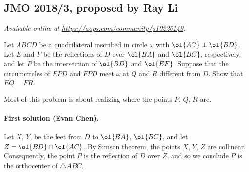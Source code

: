 \documentclass[11pt]{scrartcl}
\begin{document}
\subsection{JMO 2018/3, proposed by Ray Li}
\textsl{Available online at \url{https://aops.com/community/p10226149}.}
\begin{mdframed}[style=mdpurplebox,frametitle={Problem statement}]
Let $ABCD$ be a quadrilateral inscribed
in circle $\omega$ with $\ol{AC} \perp \ol{BD}$.
Let $E$ and $F$ be the reflections of $D$ over
$\ol{BA}$ and $\ol{BC}$, respectively, and let $P$ be
the intersection of $\ol{BD}$ and $\ol{EF}$.
Suppose that the circumcircles of $EPD$ and $FPD$
meet $\omega$ at $Q$ and $R$ different from $D$.
Show that $EQ = FR$.
\end{mdframed}
Most of this problem is about realizing where
the points $P$, $Q$, $R$ are.

\paragraph{First solution (Evan Chen).}
Let $X$, $Y$, be the feet from $D$ to $\ol{BA}$, $\ol{BC}$,
and let $Z = \ol{BD} \cap \ol{AC}$.
By Simson theorem, the points $X$, $Y$, $Z$ are collinear.
Consequently, the point $P$ is the reflection of $D$ over $Z$,
and so we conclude $P$ is the orthocenter of $\triangle ABC$.
\end{document}
